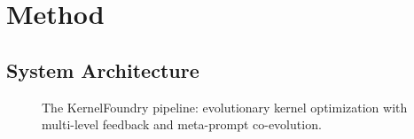 %
%
%
%


\section{Method} \label{sec:method}


\subsection{System Architecture} \label{sec:architecture}

\begin{figure}[t!]
	\centering
    \resizebox{0.6\linewidth}{!}{\PipelineDiagramB}
	\caption{The KernelFoundry pipeline: evolutionary kernel optimization with multi-level feedback and meta-prompt co-evolution.}
	\label{fig:pipeline}
	\vspace{-3mm}
\end{figure}

